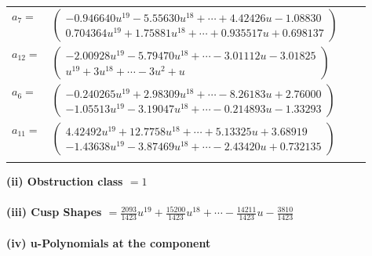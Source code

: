 \documentclass[1p]{elsarticle_modified}
\theoremstyle{definition}
\begin{document}
\begin{tabular}{m{7pt} m{180pt} m{7pt} m{180pt} }
\flushright $a_{7}=$&$\begin{pmatrix}-0.946640 u^{19}-5.55630 u^{18}+\cdots+4.42426 u-1.08830\\0.704364 u^{19}+1.75881 u^{18}+\cdots+0.935517 u+0.698137\end{pmatrix}$ \\
\flushright $a_{12}=$&$\begin{pmatrix}-2.00928 u^{19}-5.79470 u^{18}+\cdots-3.01112 u-3.01825\\u^{19}+3 u^{18}+\cdots-3 u^2+u\end{pmatrix}$ \\
\flushright $a_{6}=$&$\begin{pmatrix}-0.240265 u^{19}+2.98309 u^{18}+\cdots-8.26183 u+2.76000\\-1.05513 u^{19}-3.19047 u^{18}+\cdots-0.214893 u-1.33293\end{pmatrix}$ \\
\flushright $a_{11}=$&$\begin{pmatrix}4.42492 u^{19}+12.7758 u^{18}+\cdots+5.13325 u+3.68919\\-1.43638 u^{19}-3.87469 u^{18}+\cdots-2.43420 u+0.732135\end{pmatrix}$\\&\end{tabular}
\flushleft \textbf{(ii) Obstruction class $= 1$}\\~\\
\flushleft \textbf{(iii) Cusp Shapes $= \frac{2093}{1423} u^{19}+\frac{15200}{1423} u^{18}+\cdots-\frac{14211}{1423} u-\frac{3810}{1423}$}\\~\\
\newpage\renewcommand{\arraystretch}{1}
\flushleft \textbf{(iv) u-Polynomials at the component}\newline \\
\end{document}
